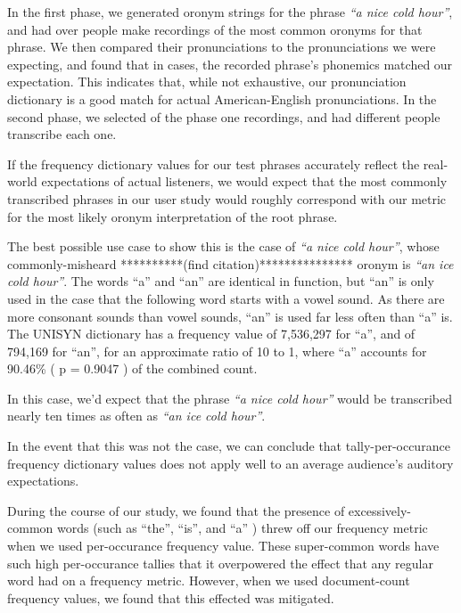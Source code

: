 In the first phase, we generated oronym strings for the phrase \emph{``a nice cold hour''},  and had over \uniqueUsersPhaseOneUserStudy people make \numResponsesPhaseOneUserStudy recordings of the most common oronyms for that phrase. We then compared their pronunciations to the pronunciations we were expecting, and found that in \numCorrectPronunciationPhaseOneUserStudy cases, the recorded phrase's phonemics matched our expectation.  This indicates that, while not exhaustive, our pronunciation dictionary is a good match for actual American-English pronunciations. In the second phase, we selected \recordingsPhaseTwoUserStudy of the phase one recordings, and had \numTranscriptionsPerRecordingPhaseTwoUserStudy different people transcribe each one.  

If the frequency dictionary values for our test phrases accurately reflect the real-world expectations of actual listeners, we would expect that the most commonly transcribed phrases in our user study would roughly correspond with our metric for the most likely oronym interpretation of the root phrase. 

The best possible use case to show this is the case of \emph{``a nice cold hour''}, whose commonly-misheard **********(find citation)*************** oronym is \emph{``an ice cold hour''}. The words  ``a'' and ``an'' are identical in function, but ``an'' is only used in the case that the following word starts with a vowel sound. As there are more consonant sounds than vowel sounds, ``an'' is used far less often than ``a'' is. The UNISYN dictionary has a frequency value of 7,536,297 for ``a'', and of 794,169 for ``an'', for an approximate ratio of 10 to 1, where ``a'' accounts for 90.46\% ( p = 0.9047 ) of the combined count.

In this case, we'd expect that the phrase  \emph{``\emph{a} nice cold hour''} would be transcribed nearly ten times as often as  \emph{``\emph{an} ice cold hour''}.

In the event that this was not the case, we can conclude that tally-per-occurance frequency dictionary values does not apply well to an average audience's auditory expectations. 

During the course of our study, we found that the presence of excessively-common words (such as ``the'', ``is'', and ``a'' ) threw off our frequency metric when we used per-occurance frequency value. These super-common words have such high per-occurance tallies that it overpowered the effect that any regular word had on a frequency metric.  However, when we used document-count frequency values, we found that this effected was mitigated.  

